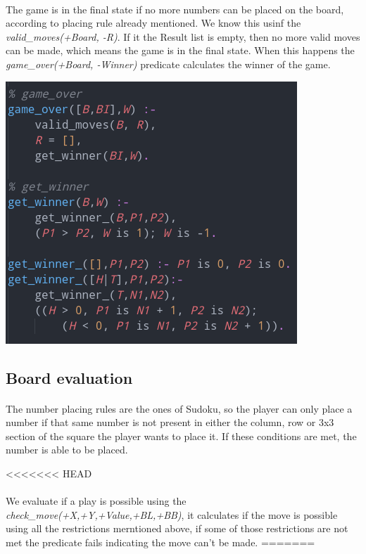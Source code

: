 \documentclass[a4paper]{article}
\begin{document}
\paragraph{}
The game is in the final state if no more numbers can be placed on the board, according to placing rule already 
mentioned. We know this usinf the \textit{valid\_moves(+Board, -R)}. If it the Result list is empty, then no more valid
moves can be made, which means the game is in the final state. When this happens the \textit{game\_over(+Board, -Winner)}
predicate calculates the winner of the game.

\begin{center}
    \includegraphics[scale=0.4]{img/game_over.png}
\end{center}

\subsection{Board evaluation}
\paragraph{}
The number placing rules are the ones of Sudoku, so the player can only place a number if that same number is not present
in either the column, row or 3x3 section of the square the player wants to place it. If these conditions are met, 
the number is able to be placed.

<<<<<<< HEAD
\paragraph{}
We evaluate if a play is possible using the \textit{check\_move(+X,+Y,+Value,+BL,+BB)}, it calculates if the move is possible using 
all the restrictions merntioned  above, if some of those restrictions are not met the predicate fails indicating the move can't be made.
=======
\end{document}
